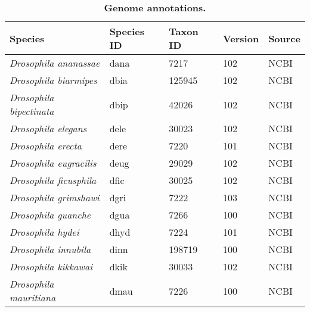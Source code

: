 \setcounter{table}{0}
\renewcommand{\thetable}{S\arabic{table}}

\begin{table}[h!]
\centering
\caption{\textbf{Genome annotations.}}
\begin{tabular}{|l|l|l|l|l|}
\hline
\textbf{Species}                       & \textbf{Species ID} & \textbf{Taxon ID} & \textbf{Version} & \textbf{Source} \\ \hline
\textit{Drosophila ananassae}          & dana                & 7217              & 102              & NCBI            \\ \hline
\textit{Drosophila biarmipes}          & dbia                & 125945            & 102              & NCBI            \\ \hline
\textit{Drosophila bipectinata}        & dbip                & 42026             & 102              & NCBI            \\ \hline
\textit{Drosophila elegans}            & dele                & 30023             & 102              & NCBI            \\ \hline
\textit{Drosophila erecta}             & dere                & 7220              & 101              & NCBI            \\ \hline
\textit{Drosophila eugracilis}         & deug                & 29029             & 102              & NCBI            \\ \hline
\textit{Drosophila ficusphila}         & dfic                & 30025             & 102              & NCBI            \\ \hline
\textit{Drosophila grimshawi}          & dgri                & 7222              & 103              & NCBI            \\ \hline
\textit{Drosophila guanche}            & dgua                & 7266              & 100              & NCBI            \\ \hline
\textit{Drosophila hydei}              & dhyd                & 7224              & 101              & NCBI            \\ \hline
\textit{Drosophila innubila}           & dinn                & 198719            & 100              & NCBI            \\ \hline
\textit{Drosophila kikkawai}           & dkik                & 30033             & 102              & NCBI            \\ \hline
\textit{Drosophila mauritiana}         & dmau                & 7226              & 100              & NCBI            \\ \hline

\end{tabular}
\end{table}
